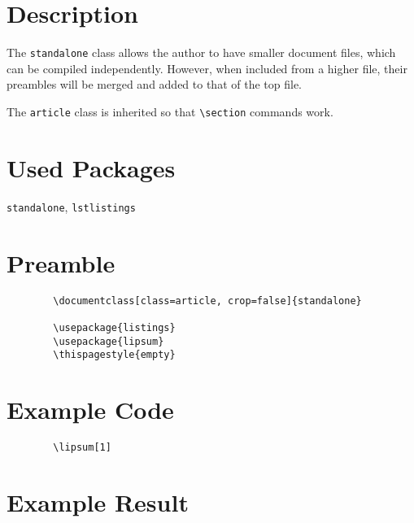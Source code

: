 \documentclass[class=article, crop=false]{standalone}
\begin{document}
	\section{Description}
	The \verb|standalone| class allows the author to have smaller document files, which can be compiled independently. However, when included from a higher file, their preambles will be merged and added to that of the top file.
	
	The \verb|article| class is inherited so that \verb|\section| commands work.
	
	\section{Used Packages}
	\verb|standalone|, \verb|lstlistings|
	
	\section{Preamble}
	\begin{lstlisting}
		\documentclass[class=article, crop=false]{standalone}
		
		\usepackage{listings}
		\usepackage{lipsum}
		\thispagestyle{empty}
	\end{lstlisting}
	
	\section{Example Code}
	\begin{lstlisting}
		\lipsum[1]
	\end{lstlisting}
	
	\section{Example Result}
	\lipsum[1]
\end{document}
